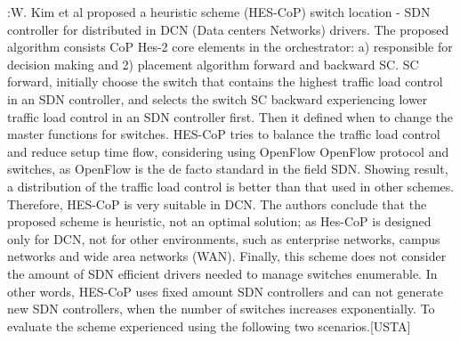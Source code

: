 \documentclass[a4paper,10pt]{article}
\begin{document}
\cite{WoLi15}:W. Kim et al proposed a heuristic scheme (HES-CoP) switch location - SDN controller for distributed in DCN (Data centers Networks) drivers. The proposed algorithm consists CoP Hes-2 core elements in the orchestrator: a) responsible for decision making and 2) placement algorithm forward and backward SC. SC forward, initially choose the switch that contains the highest traffic load control in an SDN controller, and selects the switch SC backward experiencing lower traffic load control in an SDN controller first. Then it defined when to change the master functions for switches. HES-CoP tries to balance the traffic load control and reduce setup time flow, considering using OpenFlow OpenFlow protocol and switches, as OpenFlow is the de facto standard in the field SDN. Showing result, a distribution of the traffic load control is better than that used in other schemes. Therefore, HES-CoP is very suitable in DCN. The authors conclude that the proposed scheme is heuristic, not an optimal solution; as Hes-CoP is designed only for DCN, not for other environments, such as enterprise networks, campus networks and wide area networks (WAN). Finally, this scheme does not consider the amount of SDN efficient drivers needed to manage switches enumerable. In other words, HES-CoP uses fixed amount SDN controllers and can not generate new SDN controllers, when the number of switches increases exponentially. To evaluate the scheme experienced using the following two scenarios.[USTA]
\end{document}
